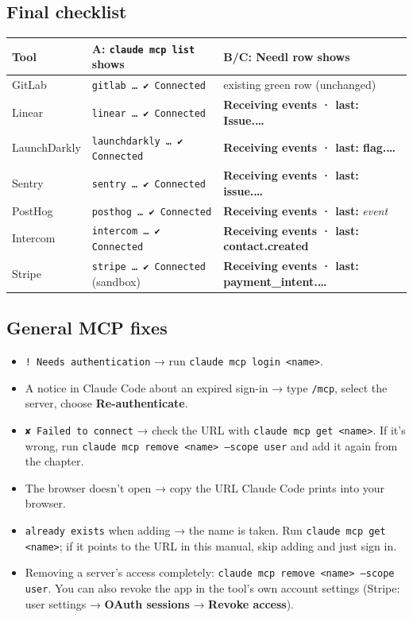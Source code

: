 \documentclass[11pt,a4paper]{article}
\newcommand{\ui}[1]{\textbf{#1}}
\newcommand{\lit}[1]{\texttt{#1}}
\begin{document}
\subsection{Final checklist}
\begin{tabularx}{\textwidth}{@{}L{28mm}YY@{}}
\toprule
\textbf{Tool} & \textbf{A: \lit{claude mcp list} shows} & \textbf{B/C: Needl row shows}\\
\midrule
GitLab & \lit{gitlab … ✔ Connected} & existing green row (unchanged)\\
Linear & \lit{linear … ✔ Connected} & \ui{Receiving events · last: Issue.…}\\
LaunchDarkly & \lit{launchdarkly … ✔ Connected} & \ui{Receiving events · last: flag.…}\\
Sentry & \lit{sentry … ✔ Connected} & \ui{Receiving events · last: issue.…}\\
PostHog & \lit{posthog … ✔ Connected} & \ui{Receiving events · last: }\textit{event}\\
Intercom & \lit{intercom … ✔ Connected} & \ui{Receiving events · last: contact.created}\\
Stripe & \lit{stripe … ✔ Connected} (sandbox) & \ui{Receiving events · last: payment\_intent.…}\\
\bottomrule
\end{tabularx}

\subsection{General MCP fixes}
\begin{itemize}
\item \lit{! Needs authentication} → run \lit{claude mcp login <name>}.
\item A notice in Claude Code about an expired sign-in → type \lit{/mcp}, select the server, choose \ui{Re-authenticate}.
\item \lit{✘ Failed to connect} → check the URL with \lit{claude mcp get <name>}. If it's wrong, run \lit{claude mcp remove <name> --scope user} and add it again from the chapter.
\item The browser doesn't open → copy the URL Claude Code prints into your browser.
\item \lit{already exists} when adding → the name is taken. Run \lit{claude mcp get <name>}; if it points to the URL in this manual, skip adding and just sign in.
\item Removing a server's access completely: \lit{claude mcp remove <name> --scope user}. You can also revoke the app in the tool's own account settings (Stripe: user settings → \ui{OAuth sessions} → \ui{Revoke access}).
\end{itemize}
\end{document}

